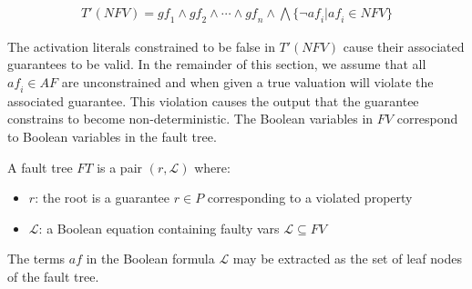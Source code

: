 \begin{gather*}
T'(\mathit{NFV}) = \mathit{gf}_1 \land \mathit{gf}_2 \land \cdots \land \mathit{gf}_n \land \bigwedge \{\neg \mathit{af}_i | \mathit{af}_i \in \mathit{NFV} \}
\end{gather*}

The activation literals constrained to be false in $T'(\mathit{NFV})$ cause their associated guarantees to be valid. In the remainder of this section, we assume that all $\mathit{af}_i \in \mathit{AF}$ are unconstrained and when given a true valuation will violate the associated guarantee. This violation causes the output that the guarantee constrains to become non-deterministic. The Boolean variables in $\mathit{FV}$ correspond to Boolean variables in the fault tree. 



\begin{definition}
A fault tree $\mathit{FT}$ is a pair $(r, \mathcal{L})$ where:
\begin{itemize}
\item[] $r$: the root is a guarantee $r \in P$ corresponding to a violated property
\item[] $\mathcal{L}$: a Boolean equation containing faulty vars $\mathcal{L} \subseteq \mathit{FV}$
\end{itemize}
\end{definition}

The terms $\mathit{af}$  in the Boolean formula $\mathcal{L}$ may be extracted as the set of leaf nodes of the fault tree. 

